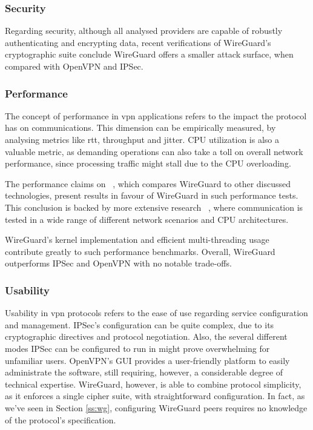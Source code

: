 \documentclass[11pt,twoside,a4paper]{report}
\begin{document}
\subsubsection{Security}

Regarding security, although all analysed providers are capable of robustly authenticating and encrypting data, recent verifications of WireGuard's cryptographic suite \cite{lipp2019mechanised, dowling2018cryptographic} conclude WireGuard offers a smaller attack surface, when compared with OpenVPN and IPSec.

\subsubsection{Performance}

The concept of performance in \ac{vpn} applications refers to the impact the protocol has on communications. This dimension can be empirically measured, by analysing metrics like \ac{rtt}, throughput and jitter. CPU utilization is also a valuable metric, as demanding operations can also take a toll on overall network performance, since processing traffic might stall due to the CPU overloading.

The performance claims on ~\cite{donenfeld2017wireguard}, which compares WireGuard to other discussed technologies, present results in favour of WireGuard in such performance tests. This conclusion is backed by more extensive research ~\cite{mackey2020performance, osswald2020performance}, where communication is tested in a wide range of different network scenarios and CPU architectures.

WireGuard's kernel implementation and efficient multi-threading usage contribute greatly to such performance benchmarks. Overall, WireGuard outperforms IPSec and OpenVPN with no notable trade-offs.

\subsubsection{Usability}

Usability in \ac{vpn} protocols refers to the ease of use regarding service configuration and management. IPSec's configuration can be quite complex, due to its cryptographic directives and protocol negotiation. Also, the several different modes IPSec can be configured to run in might prove overwhelming for unfamiliar users. OpenVPN's GUI provides a user-friendly platform to easily administrate the software, still requiring, however, a considerable degree of technical expertise. WireGuard, however, is able to combine protocol simplicity, as it enforces a single cipher suite, with straightforward configuration. In fact, as we've seen in Section \ref{ss:wg}, configuring WireGuard peers requires no knowledge of the protocol's specification.
\end{document}
